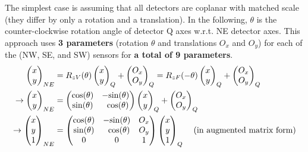 \documentclass{article}
\begin{document}
The simplest case is assuming that all detectors are coplanar with matched scale
(they differ by only a rotation and a translation). In the following, $\theta$ is
the counter-clockwise rotation angle of detector Q axes w.r.t. NE detector axes. 
This approach uses \textbf{3 parameters} (rotation $\theta$ and translations 
$O_x$ and $O_y$) for each of the (NW, SE, and SW) sensors for 
\textbf{a total of 9 parameters}.
\begin{align*}
   \begin{pmatrix}
      x \\
      y
   \end{pmatrix}_{NE}
   &=
   R_{zV}(\theta)
   \begin{pmatrix}
      x \\
      y
   \end{pmatrix}_{Q}
   +
   \begin{pmatrix}
      O_x \\
      O_y
   \end{pmatrix}_{Q}
   =
   R_{zF}(-\theta)
   \begin{pmatrix}
      x \\
      y
   \end{pmatrix}_{Q}
   +
   \begin{pmatrix}
      O_x \\
      O_y
   \end{pmatrix}_{Q} \\
   \rightarrow
   \begin{pmatrix}
      x \\
      y
   \end{pmatrix}_{NE}
   &=
   \begin{pmatrix}
      \mathrm{cos}(\theta) & -\mathrm{sin}(\theta) \\
      \mathrm{sin}(\theta) & \;\;\mathrm{cos}(\theta)
   \end{pmatrix}
   \begin{pmatrix}
      x \\
      y
   \end{pmatrix}_{Q}
   +
   \begin{pmatrix}
      O_x \\
      O_y
   \end{pmatrix}_{Q} \\
   \rightarrow
   \begin{pmatrix}
      x \\
      y \\
      1
   \end{pmatrix}_{NE}
   &=
   \begin{pmatrix}
      \mathrm{cos}(\theta) &    -\mathrm{sin}(\theta) & O_x \\
      \mathrm{sin}(\theta) & \;\;\mathrm{cos}(\theta) & O_y \\
           0 &          0 &   1
   \end{pmatrix}
   \begin{pmatrix}
      x \\
      y \\
      1
   \end{pmatrix}_{Q} 
   \;\;\;\; \textrm{(in augmented matrix form)}
\end{align*}
\end{document}
